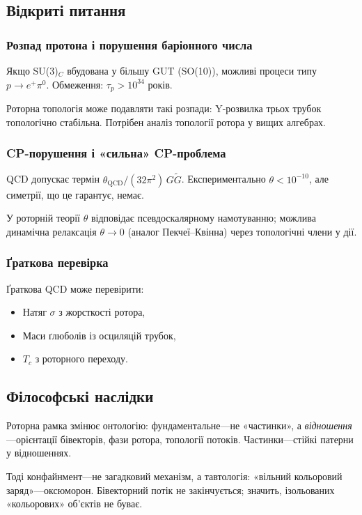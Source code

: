 \documentclass[11pt,a4paper]{article}
\theoremstyle{definition}
\theoremstyle{plain}
\theoremstyle{remark}
\begin{document}
\subsection{Відкриті питання}

\subsubsection{Розпад протона і порушення баріонного числа}

Якщо SU(3)$_C$ вбудована у більшу GUT (SO(10)), можливі процеси типу $p\to e^+\pi^0$. Обмеження: $\tau_p>10^{34}$ років.

Роторна топологія може подавляти такі розпади: Y-розвилка трьох трубок топологічно стабільна. Потрібен аналіз топології ротора у вищих алгебрах.

\subsubsection{CP-порушення і «сильна» CP-проблема}

QCD допускає термін $\theta_{\mathrm{QCD}}/(32\pi^2)\,G\tilde{G}$. Експериментально $\theta<10^{-10}$, але симетрії, що це гарантує, немає.

У роторній теорії $\theta$ відповідає псевдоскалярному намотуванню; можлива динамічна релаксація $\theta\to 0$ (аналог Пекчеї–Квінна) через топологічні члени у дії.

\subsubsection{Ґраткова перевірка}

Ґраткова QCD може перевірити:
\begin{itemize}
  \item Натяг $\sigma$ з жорсткості ротора,
  \item Маси ґлюболів із осциляцій трубок,
  \item $T_c$ з роторного переходу.
\end{itemize}

\subsection{Філософські наслідки}

Роторна рамка змінює онтологію: фундаментальне—не «частинки», а \emph{відношення}—орієнтації бівекторів, фази ротора, топології потоків. Частинки—стійкі патерни у відношеннях.

Тоді конфайнмент—не загадковий механізм, а тавтологія: «вільний кольоровий заряд»—оксюморон. Бівекторний потік не закінчується; значить, ізольованих «кольорових» об’єктів не буває.
\end{document}

